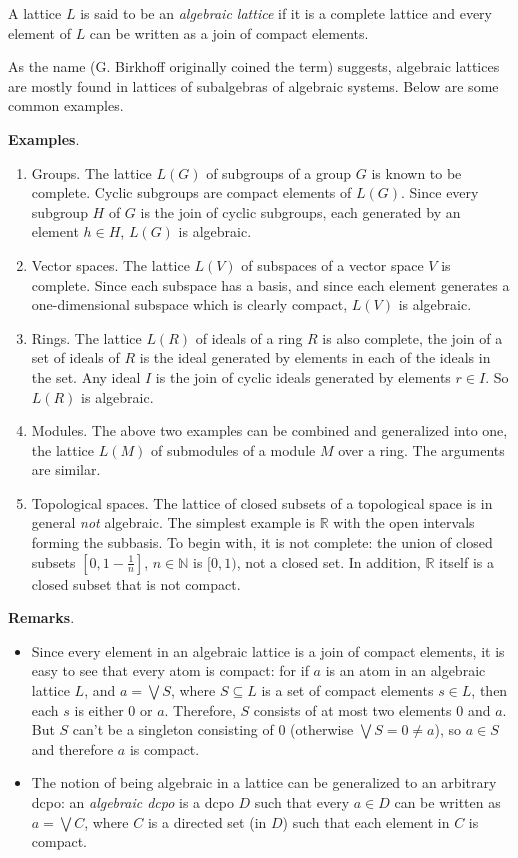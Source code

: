 \documentclass[12pt]{article}
\begin{document}
A lattice $L$ is said to be an \emph{algebraic lattice} if it is a complete lattice and every element of $L$ can be written as a join of compact elements.

As the name (G. Birkhoff originally coined the term) suggests, algebraic lattices are mostly found in lattices of subalgebras of algebraic systems.  Below are some common examples.

\textbf{Examples}.
\begin{enumerate}
\item Groups.  The lattice $L(G)$ of subgroups of a group $G$ is known to be complete.  Cyclic subgroups are compact elements of $L(G)$.  Since every subgroup $H$ of $G$ is the join of cyclic subgroups, each generated by an element $h\in H$, $L(G)$ is algebraic.
\item Vector spaces.  The lattice $L(V)$ of subspaces of a vector space $V$ is complete.  Since each subspace has a basis, and since each element generates a one-dimensional subspace which is clearly compact, $L(V)$ is algebraic.
\item Rings.  The lattice $L(R)$ of ideals of a ring $R$ is also complete, the join of a set of ideals of $R$ is the ideal generated by elements in each of the ideals in the set.  Any ideal $I$ is the join of cyclic ideals generated by elements $r\in I$.  So $L(R)$ is algebraic.
\item Modules.  The above two examples can be combined and generalized into one, the lattice $L(M)$ of submodules of a module $M$ over a ring.  The arguments are similar.
\item Topological spaces.  The lattice of closed subsets of a topological space is in general \emph{not} algebraic.  The simplest example is $\mathbb{R}$ with the open intervals forming the subbasis.  To begin with, it is not complete: the union of closed subsets $[0,1-\frac{1}{n}]$, $n\in\mathbb{N}$ is $[0,1)$, not a closed set.  In addition, $\mathbb{R}$ itself is a closed subset that is not compact.
\end{enumerate}

\textbf{Remarks}.  
\begin{itemize}
\item
Since every element in an algebraic lattice is a join of compact elements, it is easy to see that every atom is compact: for if $a$ is an atom in an algebraic lattice $L$, and $a=\bigvee S$, where $S\subseteq L$ is a set of compact elements $s\in L$, then each $s$ is either $0$ or $a$.  Therefore, $S$ consists of at most two elements $0$ and $a$.  But $S$ can't be a singleton consisting of $0$ (otherwise $\bigvee S=0\neq a$), so $a\in S$ and therefore $a$ is compact.
\item
The notion of being algebraic in a lattice can be generalized to an arbitrary dcpo:  an \emph{algebraic dcpo} is a dcpo $D$ such that every $a\in D$ can be written as $a=\bigvee C$, where $C$ is a directed set (in $D$) such that each element in $C$ is compact. 
\end{itemize}
\end{document}
